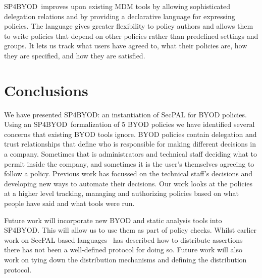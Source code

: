 \documentclass{llncs}
\newcommand{\AppPAL}[0]{SP4BYOD}
\begin{document}
\AppPAL~improves upon existing MDM tools by allowing sophisticated delegation relations and by providing a declarative language for expressing policies.
The language gives greater flexibility to policy authors and allows them to write policies that depend on other policies rather than predefined settings and groups.
It lets us track what users have agreed to, what their policies are, how they are specified, and how they are satisfied.


\section{Conclusions}
\label{sec:conclusions}

We have presented \AppPAL: an instantiation of SecPAL for BYOD policies.
Using an \AppPAL~formalization of 5 BYOD policies we have identified several concerns that existing BYOD tools ignore.
BYOD policies contain delegation and trust relationships that define who is responsible for making different decisions in a company.
Sometimes that is administrators and technical staff deciding what to permit inside the company, and sometimes it is the user's themselves agreeing to follow a policy.
Previous work has focussed on the technical staff's decisions and developing new ways to automate their decisions.
Our work looks at the policies at a higher level tracking, managing and authorizing policies based on what people have said and what tools were run.

Future work will incorporate new BYOD and static analysis tools into \AppPAL. 
This will allow us to use them as part of policy checks.
Whilst earlier work on SecPAL based languages~\cite{becker_secpal:_2010,moritz_y_becker_secpal:_2009} has described how to distribute assertions there has not been a well-defined protocol for doing so.
Future work will also work on tying down the distribution mechanisms and defining the distribution protocol.

%
\printbibliography
\end{document}
